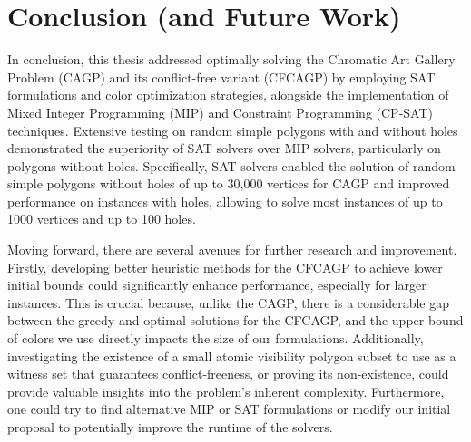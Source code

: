 \chapter{Conclusion (and Future Work)}

In conclusion, this thesis addressed optimally solving the Chromatic Art Gallery Problem (CAGP) and its conflict-free variant (CFCAGP) by employing SAT formulations and color optimization strategies, alongside the implementation of Mixed Integer Programming (MIP) and Constraint Programming (CP-SAT) techniques. Extensive testing on random simple polygons with and without holes demonstrated the superiority of SAT solvers over MIP solvers, particularly on polygons without holes. Specifically, SAT solvers enabled the solution of random simple polygons without holes of up to 30,000 vertices for CAGP and improved performance on instances with holes, allowing to solve most instances of up to 1000 vertices and up to 100 holes.

Moving forward, there are several avenues for further research and improvement. Firstly, developing better heuristic methods for the CFCAGP to achieve lower initial bounds could significantly enhance performance, especially for larger instances. This is crucial because, unlike the CAGP, there is a considerable gap between the greedy and optimal solutions for the CFCAGP, and the upper bound of colors we use directly impacts the size of our formulations. Additionally, investigating the existence of a small atomic visibility polygon subset to use as a witness set that guarantees conflict-freeness, or proving its non-existence, could provide valuable insights into the problem's inherent complexity. Furthermore, one could try to find alternative MIP or SAT formulations or modify our initial proposal to potentially improve the runtime of the solvers.





